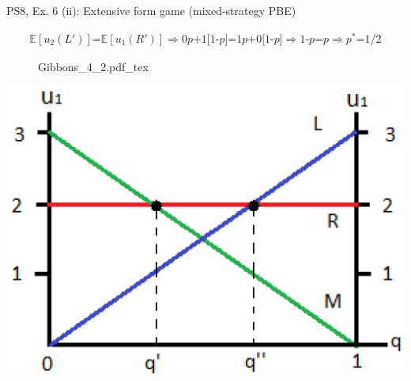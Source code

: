 \begin{frame}{PS8, Ex. 6 (ii): Extensive form game (mixed-strategy PBE)}
\begin{multicols}{2}
      \begin{align*}
        \mathbb{E}[u_2(L')]\text{=}\mathbb{E}[u_1(R')]\Rightarrow \text{0}p\text{+1[1-}p\text{]=}\text{1}p\text{+0[1-}p\text{]}\Rightarrow \text{1-}p\text{=}p\Rightarrow p^*\text{=}1/2
      \end{align*}
      \vfill\null\columnbreak
      \begin{figure}[!h]
        \center {}
        {Gibbons_4_2.pdf_tex}
      \end{figure}
      \includegraphics[width=1.1\columnwidth]{figures/Gibbons_4_2_E[u]}
      \vfill\null
    \end{multicols}
\end{frame}
